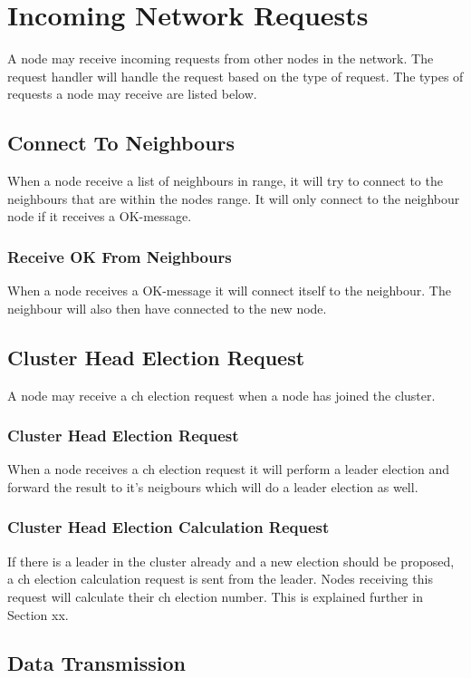 \documentclass[USenglish]{uit-thesis}
\begin{document}
\section{Incoming Network Requests}
A node may receive incoming requests from other nodes in the network. The request handler will handle the request based on the type of request. The types of requests a node may receive are listed below.

\subsection{Connect To Neighbours}
When a node receive a list of neighbours in range, it will try to connect to the neighbours that are within the nodes range. It will only connect to the neighbour node if it receives a OK-message.

\subsubsection{Receive OK From Neighbours}
When a node receives a OK-message it will connect itself to the neighbour. The neighbour will also then have connected to the new node.

\subsection{Cluster Head Election Request}
A node may receive a \gls{ch} election request when a node has joined the cluster.

\subsubsection{Cluster Head Election Request}
When a node receives a \gls{ch} election request it will perform a leader election and forward the result to it's neigbours which will do a leader election as well.

\subsubsection{Cluster Head Election Calculation Request}
If there is a leader in the cluster already and a new election should be proposed, a \gls{ch} election calculation request is sent from the leader. Nodes receiving this request will calculate their \gls{ch} election number. This is explained further in Section xx.

\subsection{Data Transmission}
\end{document}
